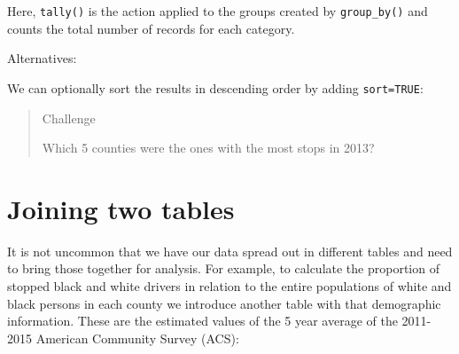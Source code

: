 \documentclass[]{book}
\newenvironment{Shaded}{\begin{snugshade}}{\end{snugshade}}
\newcommand{\KeywordTok}[1]{\textcolor[rgb]{0.13,0.29,0.53}{\textbf{#1}}}
\newcommand{\DataTypeTok}[1]{\textcolor[rgb]{0.13,0.29,0.53}{#1}}
\newcommand{\StringTok}[1]{\textcolor[rgb]{0.31,0.60,0.02}{#1}}
\newcommand{\CommentTok}[1]{\textcolor[rgb]{0.56,0.35,0.01}{\textit{#1}}}
\newcommand{\OtherTok}[1]{\textcolor[rgb]{0.56,0.35,0.01}{#1}}
\newcommand{\OperatorTok}[1]{\textcolor[rgb]{0.81,0.36,0.00}{\textbf{#1}}}
\newcommand{\NormalTok}[1]{#1}
\theoremstyle{definition}
\theoremstyle{definition}
\theoremstyle{definition}
\theoremstyle{remark}
\begin{document}
Here, \texttt{tally()} is the action applied to the groups created by
\texttt{group\_by()} and counts the total number of records for each
category.

Alternatives:

\begin{Shaded}
\end{Shaded}

We can optionally sort the results in descending order by adding
\texttt{sort=TRUE}:

\begin{Shaded}
\end{Shaded}

\begin{quote}
Challenge

Which 5 counties were the ones with the most stops in 2013?
\end{quote}

\section{Joining two tables}\label{joining-two-tables}

It is not uncommon that we have our data spread out in different tables
and need to bring those together for analysis. For example, to calculate
the proportion of stopped black and white drivers in relation to the
entire populations of white and black persons in each county we
introduce another table with that demographic information. These are the
estimated values of the 5 year average of the 2011-2015 American
Community Survey (ACS):
\end{document}
